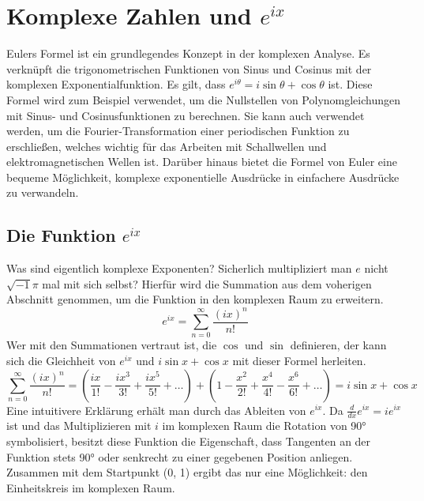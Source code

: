 \section{Komplexe Zahlen und $e^{ix}$}
Eulers Formel ist ein grundlegendes Konzept in der komplexen Analyse. Es verknüpft die trigonometrischen Funktionen von Sinus und Cosinus mit der komplexen Exponentialfunktion. Es gilt, dass $e^{i\theta} = i\sin\theta + \cos\theta$ ist.
Diese Formel wird zum Beispiel verwendet, um die Nullstellen von Polynomgleichungen mit Sinus- und Cosinusfunktionen zu berechnen. Sie kann auch verwendet werden, um die Fourier-Transformation einer periodischen Funktion zu erschließen, welches wichtig für das Arbeiten mit Schallwellen und elektromagnetischen Wellen ist. Darüber hinaus bietet die Formel von Euler eine bequeme Möglichkeit, komplexe exponentielle Ausdrücke in einfachere Ausdrücke zu verwandeln.
\subsection{Die Funktion $e^{ix}$}
Was sind eigentlich komplexe Exponenten? Sicherlich multipliziert man $e$ nicht $\sqrt{-1}\pi$ mal mit sich selbst? Hierfür wird die Summation aus dem voherigen Abschnitt genommen, um die Funktion in den komplexen Raum zu erweitern. \[
  e^{ix} = \sum_{n=0}^\infty \frac{(ix)^n}{n!}
  \] Wer mit den Summationen vertraut ist, die $\cos$ und  $\sin$ definieren, der kann sich die Gleichheit von $e^{ix}$ und  $i\sin{x}+ \cos{x}$ mit dieser Formel herleiten.  \[
\sum_{n=0}^\infty \frac{(ix)^n}{n!} = (\frac{ix}{1!} - \frac{ix^3}{3!} + \frac{ix^5}{5!} + \dots) + (1 - \frac{x^2}{2!} + \frac{x^4}{4!} - \frac{x^6}{6!} + \dots) = i\sin{x} + \cos{x}
\] Eine intuitivere Erklärung erhält man durch das Ableiten von $e^{ix}$. Da  $\frac{d}{dx}e^{ix} = ie^{ix}$ ist und das Multiplizieren mit $i$ im komplexen Raum die Rotation von 90° symbolisiert, besitzt diese Funktion die Eigenschaft, dass Tangenten an der Funktion stets 90° oder senkrecht 
zu einer gegebenen Position anliegen. Zusammen mit dem Startpunkt (0, 1) ergibt das nur eine Möglichkeit: den Einheitskreis im komplexen Raum.
